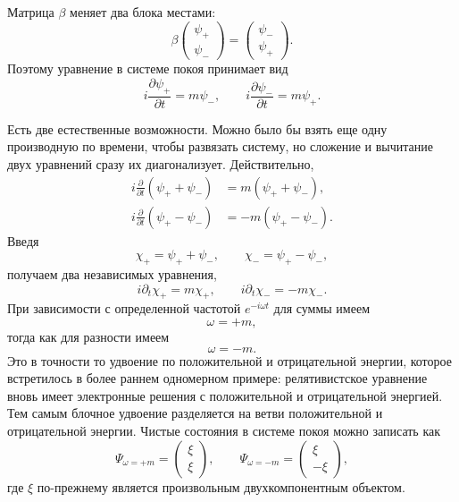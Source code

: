 Матрица \(\beta\) меняет два блока местами:
\begin{equation}
\beta
\begin{pmatrix}
\psi_+\\
\psi_-
\end{pmatrix}
=
\begin{pmatrix}
\psi_-\\
\psi_+
\end{pmatrix}.
\end{equation}
Поэтому уравнение в системе покоя принимает вид
\begin{equation}
i\frac{\partial\psi_+}{\partial t}=m\psi_-,
\qquad
i\frac{\partial\psi_-}{\partial t}=m\psi_+.
\end{equation}

Есть две естественные возможности. Можно было бы взять еще одну производную по времени, чтобы развязать систему, но сложение и вычитание двух уравнений сразу их диагонализует. Действительно,
\begin{align}
i\frac{\partial}{\partial t}(\psi_++\psi_-)
&=m(\psi_++\psi_-),\\
i\frac{\partial}{\partial t}(\psi_+-\psi_-)
&=-m(\psi_+-\psi_-).
\end{align}
Введя
\begin{equation}
\chi_+=\psi_++\psi_-,
\qquad
\chi_-=\psi_+-\psi_-,
\end{equation}
получаем два независимых уравнения,
\begin{equation}
i\partial_t\chi_+=m\chi_+,
\qquad
i\partial_t\chi_-=-m\chi_-.
\end{equation}
При зависимости с определенной частотой \(e^{-i\omega t}\) для суммы имеем
\begin{equation}
\omega=+m,
\end{equation}
тогда как для разности имеем
\begin{equation}
\omega=-m.
\end{equation}
Это в точности то удвоение по положительной и отрицательной энергии, которое встретилось в более раннем одномерном примере: релятивистское уравнение вновь имеет электронные решения с положительной и отрицательной энергией. Тем самым блочное удвоение разделяется на ветви положительной и отрицательной энергии. Чистые состояния в системе покоя можно записать как
\begin{equation}
\Psi_{\omega=+m}=
\begin{pmatrix}
\xi\\
\xi
\end{pmatrix},
\qquad
\Psi_{\omega=-m}=
\begin{pmatrix}
\xi\\
-\xi
\end{pmatrix},
\end{equation}
где \(\xi\) по-прежнему является произвольным двухкомпонентным объектом.

